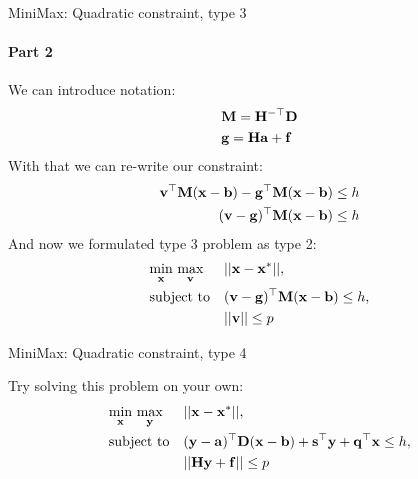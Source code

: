 \documentclass{beamer}
\begin{document}
\begin{frame}{MiniMax: Quadratic constraint, type 3}
\framesubtitle{Part 2}
\begin{flushleft}

We can introduce notation:
%
\begin{align}
    & \mathbf{M} = \mathbf{H}^{-\top} \mathbf{D} \\
    & \mathbf{g} = \mathbf{H}\mathbf{a} + \mathbf{f}
\end{align}
With that we can re-write our constraint:
%
\begin{align}
    \mathbf{v}^\top \mathbf{M} (\mathbf{x} - \mathbf{b}) - \mathbf{g}^\top \mathbf{M} (\mathbf{x} - \mathbf{b}) \leq h \\
    (\mathbf{v} - \mathbf{g})^\top \mathbf{M} (\mathbf{x} - \mathbf{b}) \leq h 
\end{align}
%
And now we formulated type 3 problem as type 2:
%
\begin{equation}
\begin{aligned}
& \underset{\mathbf{x}}{\text{min}} \ \underset{\mathbf{v}}{\text{max}}
& & ||\mathbf{x} - \mathbf{x}^*||, \\
& \text{subject to}
& & (\mathbf{v} - \mathbf{g})^\top \mathbf{M} (\mathbf{x} - \mathbf{b}) \leq h, \\
& & & ||\mathbf{v}|| \leq p
\end{aligned}
\end{equation}

 
\end{flushleft}
\end{frame}



\begin{frame}{MiniMax: Quadratic constraint, type 4}
\begin{flushleft}

Try solving this problem on your own:
%
\begin{equation}
\begin{aligned}
& \underset{\mathbf{x}}{\text{min}} \ \underset{\mathbf{y}}{\text{max}}
& & ||\mathbf{x} - \mathbf{x}^*||, \\
& \text{subject to}
& & (\mathbf{y} - \mathbf{a})^\top \mathbf{D} (\mathbf{x} - \mathbf{b})  + 
\mathbf{s}^\top \mathbf{y} + \mathbf{q}^\top \mathbf{x} \leq h, \\
& & & ||\mathbf{H}\mathbf{y} + \mathbf{f}|| \leq p
\end{aligned}
\end{equation}
 
\end{flushleft}
\end{frame}
\end{document}
